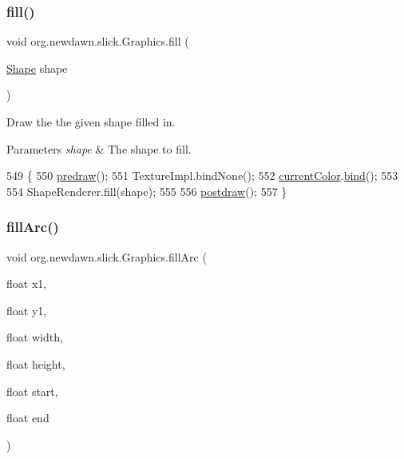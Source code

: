 \subsubsection{\texorpdfstring{fill()}{fill()}\hspace{0.1cm}{\footnotesize\ttfamily [2/2]}}
{\footnotesize\ttfamily void org.\+newdawn.\+slick.\+Graphics.\+fill (\begin{DoxyParamCaption}\item[{\mbox{\hyperlink{classorg_1_1newdawn_1_1slick_1_1geom_1_1_shape}{Shape}}}]{shape }\end{DoxyParamCaption})\hspace{0.3cm}{\ttfamily [inline]}}

Draw the the given shape filled in.


\begin{DoxyParams}{Parameters}
{\em shape} & The shape to fill. \\
\hline
\end{DoxyParams}

\begin{DoxyCode}
549                                   \{
550         \mbox{\hyperlink{classorg_1_1newdawn_1_1slick_1_1_graphics_a7b4c203181e3b6302d51ed9b24596b8d}{predraw}}();
551         TextureImpl.bindNone();
552         \mbox{\hyperlink{classorg_1_1newdawn_1_1slick_1_1_graphics_add4b542e574390a735aad66468135d5a}{currentColor}}.\mbox{\hyperlink{classorg_1_1newdawn_1_1slick_1_1_color_ae4b71c94854f7983f2ccdb7340438e23}{bind}}();
553 
554         ShapeRenderer.fill(shape);
555 
556         \mbox{\hyperlink{classorg_1_1newdawn_1_1slick_1_1_graphics_abe054371d1486618ff327bbbcf02ff97}{postdraw}}();
557     \}
\end{DoxyCode}
\mbox{\label{classorg_1_1newdawn_1_1slick_1_1_graphics_a6edeaec933b806a6a989023395d9b66e}} 
\subsubsection{\texorpdfstring{fill\+Arc()}{fillArc()}\hspace{0.1cm}{\footnotesize\ttfamily [1/2]}}
{\footnotesize\ttfamily void org.\+newdawn.\+slick.\+Graphics.\+fill\+Arc (\begin{DoxyParamCaption}\item[{float}]{x1,  }\item[{float}]{y1,  }\item[{float}]{width,  }\item[{float}]{height,  }\item[{float}]{start,  }\item[{float}]{end }\end{DoxyParamCaption})\hspace{0.3cm}{\ttfamily [inline]}}


